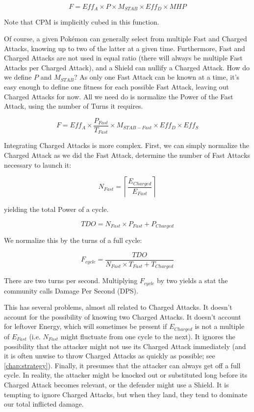 \[ F = Eff_A \times P \times M_{STAB} \times Eff_D \times MHP \]

Note that CPM is implicitly cubed in this function.

Of course, a given Pokémon can generally select from multiple Fast and Charged Attacks,
  knowing up to two of the latter at a given time.
Furthermore, Fast and Charged Attacks are not used in equal ratio (there will
  always be multiple Fast Attacks per Charged Attack), and a Shield can
  nullify a Charged Attack.
How do we define $P$ and $M_{STAB}$?
As only one Fast Attack can be known at a time, it's easy enough to define one
  fitness for each possible Fast Attack, leaving out Charged Attacks for now.
All we need do is normalize the Power of the Fast Attack, using the number of
  Turns it requires.

\[ F = Eff_A \times \frac{P_{Fast}}{T_{Fast}} \times M_{STAB-Fast} \times Eff_D \times Eff_S \]

Integrating Charged Attacks is more complex.
First, we can simply normalize the Charged Attack as we did the Fast Attack,
 determine the number of Fast Attacks necessary to launch it:

\[ N_{Fast} = \left\lceil\frac{E_{Charged}}{E_{Fast}}\right\rceil \]

yielding the total Power of a cycle.

\[ TDO = N_{Fast} \times P_{Fast} + P_{Charged} \]

We normalize this by the turns of a full cycle:

\[ F_{cycle} = \frac{TDO}{N_{Fast} \times T_{Fast} + T_{Charged}} \]

There are two turns per second. Multiplying $F_{cycle}$ by two yields a
  stat the community calls Damage Per Second (DPS).

This has several problems, almost all related to Charged Attacks.
It doesn't account for the possibility of knowing two Charged Attacks.
It doesn't account for leftover Energy, which will sometimes be present if
  $E_{Charged}$ is not a multiple of $E_{Fast}$ (i.e. $N_{Fast}$
  might fluctuate from one cycle to the next).
It ignores the possibility that the attacker might not use its Charged Attack
  immediately (and it is often unwise to throw Charged Attacks as quickly as
  possible; see \autoref{chap:strategy}).
Finally, it presumes that the attacker can always get off a full cycle.
In reality, the attacker might be knocked out or substituted long before its
  Charged Attack becomes relevant, or the defender might use a Shield.
It is tempting to ignore Charged Attacks, but when they land, they tend to
  dominate our total inflicted damage.


